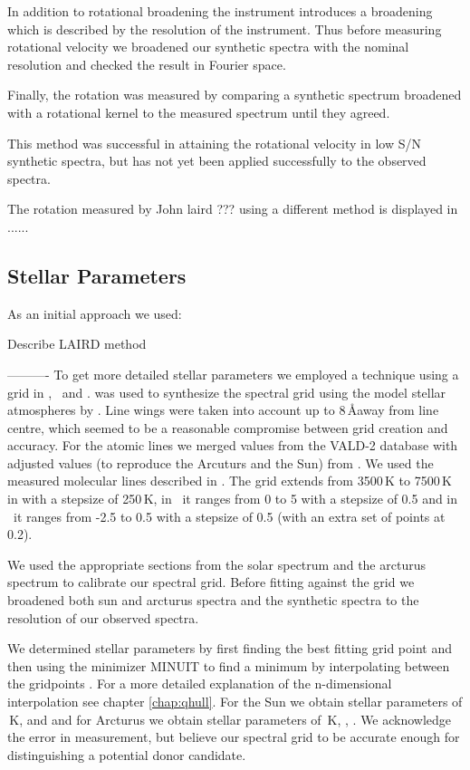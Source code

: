In addition to rotational broadening the instrument introduces a broadening which is described by the resolution of the instrument. Thus before measuring rotational velocity we broadened our synthetic spectra with the nominal resolution and checked the result in Fourier space. 

Finally, the rotation was measured by comparing a synthetic spectrum broadened with a rotational kernel to the measured spectrum until they agreed. 

This method was successful in attaining the rotational velocity in low S/N synthetic spectra, but has not yet been applied successfully to the observed spectra.

The rotation measured by John laird ??? using a different method is displayed in ......


\subsection{Stellar Parameters}

As an initial approach we used: 

Describe LAIRD method

----------
To get more detailed stellar parameters we employed a technique using a grid in \teff, \logg\ and \feh. 
\moog \citep{1973ApJ...184..839S} was used to synthesize the spectral grid using the model stellar atmospheres by \citet{2003IAUS..210P.A20C}. Line wings were taken into account up to 8\,\AA away from line centre, which seemed to be a reasonable compromise between grid creation and accuracy. For the atomic lines we merged values from the VALD-2 database \citep{2000BaltA...9..590K} with adjusted values (to reproduce the Arcuturs and the Sun) from \cite{2008A&A...486..951G}. We used the measured
molecular lines described in  \citet{1995KurCD..23.....K}. 
The grid extends from 3500\,K to 7500\,K in \teff with a stepsize of 250\,K, in \logg\ it ranges from  0 to 5 with a stepsize of 0.5 and in \feh\ it ranges from -2.5 to 0.5 with a stepsize of 0.5 (with an extra set of points at 0.2). 

We used the appropriate sections from the solar spectrum \citep{1984sfat.book.....K} and the arcturus spectrum  \cite{2000vnia.book.....H} to calibrate our spectral grid. 
Before fitting against the grid we broadened both sun and arcturus spectra and the synthetic spectra to the resolution of our observed spectra. 

We determined stellar parameters by first finding the best fitting grid point and then using the minimizer MINUIT to find a minimum by interpolating between the gridpoints \citep[using][]{Barber96thequickhull}. For a more detailed explanation of the n-dimensional interpolation see chapter \ref{chap:qhull}. For the Sun we obtain stellar parameters of \,K,  and  and for Arcturus we obtain stellar parameters of \,K, , . 
We acknowledge the error in measurement, but believe our spectral grid to be accurate enough for distinguishing a potential donor candidate. 

